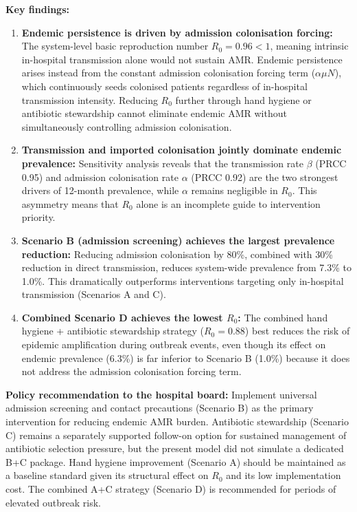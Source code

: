\documentclass[12pt,a4paper]{article}
\begin{document}
\textbf{Key findings:}
\begin{enumerate}
  \item \textbf{Endemic persistence is driven by admission colonisation forcing:} The system-level basic reproduction number $R_0 = 0.96 < 1$, meaning intrinsic in-hospital transmission alone would not sustain AMR. Endemic persistence arises instead from the constant admission colonisation forcing term ($\alpha \mu N$), which continuously seeds colonised patients regardless of in-hospital transmission intensity. Reducing $R_0$ further through hand hygiene or antibiotic stewardship cannot eliminate endemic AMR without simultaneously controlling admission colonisation.
  \item \textbf{Transmission and imported colonisation jointly dominate endemic prevalence:} Sensitivity analysis reveals that the transmission rate $\beta$ (PRCC 0.95) and admission colonisation rate $\alpha$ (PRCC 0.92) are the two strongest drivers of 12-month prevalence, while $\alpha$ remains negligible in $R_0$. This asymmetry means that $R_0$ alone is an incomplete guide to intervention priority.
  \item \textbf{Scenario B (admission screening) achieves the largest prevalence reduction:} Reducing admission colonisation by 80\%, combined with 30\% reduction in direct transmission, reduces system-wide prevalence from 7.3\% to 1.0\%. This dramatically outperforms interventions targeting only in-hospital transmission (Scenarios A and C).
  \item \textbf{Combined Scenario D achieves the lowest $R_0$:} The combined hand hygiene + antibiotic stewardship strategy ($R_0 = 0.88$) best reduces the risk of epidemic amplification during outbreak events, even though its effect on endemic prevalence (6.3\%) is far inferior to Scenario B (1.0\%) because it does not address the admission colonisation forcing term.
\end{enumerate}

\textbf{Policy recommendation to the hospital board:} Implement universal admission screening and contact precautions (Scenario B) as the primary intervention for reducing endemic AMR burden. Antibiotic stewardship (Scenario C) remains a separately supported follow-on option for sustained management of antibiotic selection pressure, but the present model did not simulate a dedicated B+C package. Hand hygiene improvement (Scenario A) should be maintained as a baseline standard given its structural effect on $R_0$ and its low implementation cost. The combined A+C strategy (Scenario D) is recommended for periods of elevated outbreak risk.
\end{document}
